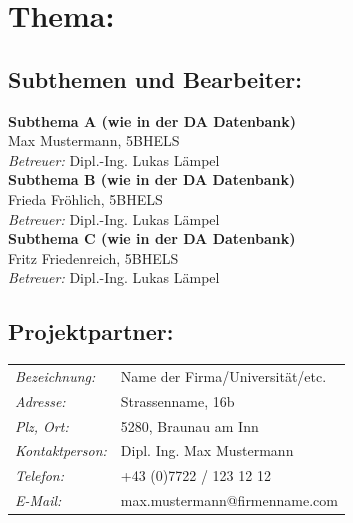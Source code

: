 

\chapter*{Thema: \newline \htlArbeitsthema }



\section*{Subthemen und Bearbeiter:}


\textbf{Subthema A (wie in der DA Datenbank)}\\ 
Max Mustermann, 5BHELS\\
\emph{Betreuer:} Dipl.-Ing. Lukas Lämpel\\[2ex] 
%
\textbf{Subthema B (wie in der DA Datenbank)}\\ 
Frieda Fröhlich, 5BHELS\\
\emph{Betreuer:} Dipl.-Ing. Lukas Lämpel\\[2ex] 
%
\textbf{Subthema C (wie in der DA Datenbank)}\\ 
Fritz Friedenreich, 5BHELS\\
\emph{Betreuer:} Dipl.-Ing. Lukas Lämpel\\[2em]



\section*{Projektpartner:}

\renewcommand{\arraystretch}{1.5}
\begin{tabularx}{1\textwidth}{@{} l X @{}}

\emph{Bezeichnung:} & Name der Firma/Universität/etc.\\
\emph{Adresse:} & Strassenname, 16b\\
\emph{Plz, Ort:} & 5280, Braunau am Inn\\
\emph{Kontaktperson:} & Dipl. Ing. Max Mustermann\\
\emph{Telefon:} & +43 (0)7722 / 123 12 12\\
\emph{E-Mail:} & max.mustermann@firmenname.com\\

\end{tabularx}


